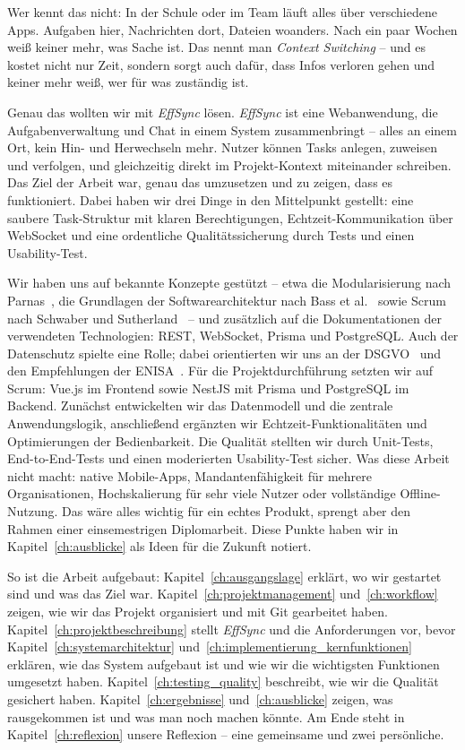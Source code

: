 
Wer kennt das nicht: In der Schule oder im Team läuft alles über verschiedene Apps.
Aufgaben hier, Nachrichten dort, Dateien woanders.
Nach ein paar Wochen weiß keiner mehr, was Sache ist.
Das nennt man \textit{Context Switching} -- und es kostet nicht nur Zeit, sondern
sorgt auch dafür, dass Infos verloren gehen und keiner mehr weiß, wer für was
zuständig ist.

Genau das wollten wir mit \textit{EffSync} lösen.
\textit{EffSync} ist eine Webanwendung, die Aufgabenverwaltung und Chat in einem
System zusammenbringt -- alles an einem Ort, kein Hin- und Herwechseln mehr.
Nutzer können Tasks anlegen, zuweisen und verfolgen, und gleichzeitig direkt im
Projekt-Kontext miteinander schreiben.
Das Ziel der Arbeit war, genau das umzusetzen und zu zeigen, dass es funktioniert.
Dabei haben wir drei Dinge in den Mittelpunkt gestellt: eine saubere Task-Struktur
mit klaren Berechtigungen, Echtzeit-Kommunikation über WebSocket und eine ordentliche
Qualitätssicherung durch Tests und einen Usability-Test.

Wir haben uns auf bekannte Konzepte gestützt – etwa die Modularisierung nach
Parnas~\cite{parnas1972criteria}, die Grundlagen der Softwarearchitektur nach
Bass et al.\ \cite{bass2012software} sowie Scrum nach Schwaber und
Sutherland~\cite{schwaber2020scrum} – und zusätzlich auf die Dokumentationen der verwendeten
Technologien: REST, WebSocket, Prisma und PostgreSQL.
Auch der Datenschutz spielte eine Rolle; dabei orientierten wir uns an der DSGVO~\cite{dsgvo2016}
und den Empfehlungen der ENISA~\cite{enisa2019pseudonymisation}.
Für die Projektdurchführung setzten wir auf Scrum: Vue.js im Frontend sowie NestJS mit
Prisma und PostgreSQL im Backend.
Zunächst entwickelten wir das Datenmodell und die zentrale Anwendungslogik, anschließend
ergänzten wir Echtzeit-Funktionalitäten und Optimierungen der Bedienbarkeit.
Die Qualität stellten wir durch Unit-Tests, End-to-End-Tests und einen moderierten
Usability-Test sicher.
Was diese Arbeit nicht macht: native Mobile-Apps, Mandantenfähigkeit für mehrere
Organisationen, Hochskalierung für sehr viele Nutzer oder vollständige Offline-Nutzung.
Das wäre alles wichtig für ein echtes Produkt, sprengt aber den Rahmen einer
einsemestrigen Diplomarbeit.
Diese Punkte haben wir in Kapitel~\ref{ch:ausblicke} als Ideen für die Zukunft notiert.

So ist die Arbeit aufgebaut:
Kapitel~\ref{ch:ausgangslage} erklärt, wo wir gestartet sind und was das Ziel war.
Kapitel~\ref{ch:projektmanagement} und~\ref{ch:workflow} zeigen, wie wir das Projekt
organisiert und mit Git gearbeitet haben.
Kapitel~\ref{ch:projektbeschreibung} stellt \textit{EffSync} und die Anforderungen
vor, bevor Kapitel~\ref{ch:systemarchitektur}
und~\ref{ch:implementierung_kernfunktionen} erklären, wie das System aufgebaut ist
und wie wir die wichtigsten Funktionen umgesetzt haben.
Kapitel~\ref{ch:testing_quality} beschreibt, wie wir die Qualität gesichert haben.
Kapitel~\ref{ch:ergebnisse} und~\ref{ch:ausblicke} zeigen, was rausgekommen ist
und was man noch machen könnte.
Am Ende steht in Kapitel~\ref{ch:reflexion} unsere Reflexion -- eine gemeinsame
und zwei persönliche.